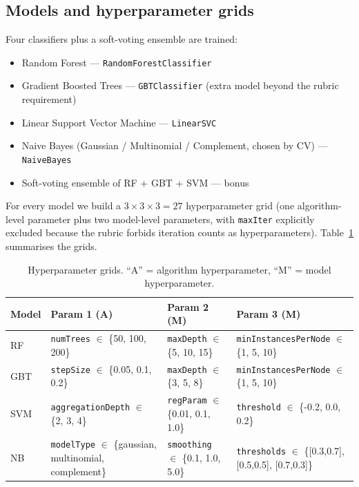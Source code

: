 \documentclass[11pt,a4paper]{article}
\begin{document}
\subsection{Models and hyperparameter grids}
Four classifiers plus a soft-voting ensemble are trained:

\begin{itemize}[leftmargin=*]
  \item Random Forest --- \texttt{RandomForestClassifier}
  \item Gradient Boosted Trees --- \texttt{GBTClassifier} (extra
    model beyond the rubric requirement)
  \item Linear Support Vector Machine --- \texttt{LinearSVC}
  \item Naive Bayes (Gaussian / Multinomial / Complement, chosen by
    CV) --- \texttt{NaiveBayes}
  \item Soft-voting ensemble of RF + GBT + SVM --- bonus
\end{itemize}

For every model we build a \textbf{$3 \times 3 \times 3 = 27$}
hyperparameter grid (one algorithm-level parameter plus two
model-level parameters, with \texttt{maxIter} explicitly excluded
because the rubric forbids iteration counts as hyperparameters).
Table~\ref{tab:grids} summarises the grids.

\begin{table}[h]
\centering
\caption{Hyperparameter grids.  ``A'' = algorithm hyperparameter,
``M'' = model hyperparameter.}
\label{tab:grids}
\small
\begin{tabularx}{\linewidth}{l X X X}
\toprule
\textbf{Model} & \textbf{Param 1 (A)} & \textbf{Param 2 (M)} & \textbf{Param 3 (M)} \\
\midrule
RF  & \texttt{numTrees} $\in$ \{50, 100, 200\}            & \texttt{maxDepth} $\in$ \{5, 10, 15\}      & \texttt{minInstancesPerNode} $\in$ \{1, 5, 10\} \\
GBT & \texttt{stepSize} $\in$ \{0.05, 0.1, 0.2\}           & \texttt{maxDepth} $\in$ \{3, 5, 8\}        & \texttt{minInstancesPerNode} $\in$ \{1, 5, 10\} \\
SVM & \texttt{aggregationDepth} $\in$ \{2, 3, 4\}          & \texttt{regParam} $\in$ \{0.01, 0.1, 1.0\} & \texttt{threshold} $\in$ \{-0.2, 0.0, 0.2\} \\
NB  & \texttt{modelType} $\in$ \{gaussian, multinomial, complement\} & \texttt{smoothing} $\in$ \{0.1, 1.0, 5.0\} & \texttt{thresholds} $\in$ \{[0.3,0.7], [0.5,0.5], [0.7,0.3]\} \\
\bottomrule
\end{tabularx}
\end{table}
\end{document}
